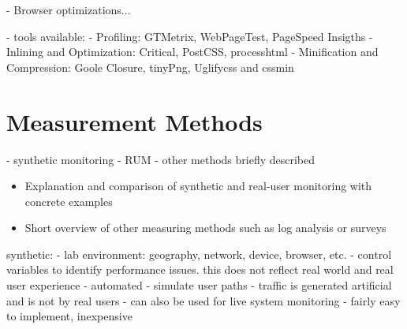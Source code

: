 





- Browser optimizations...

- tools available:
- Profiling: GTMetrix, WebPageTest, PageSpeed Insigths
- Inlining and Optimization: Critical, PostCSS, processhtml
- Minification and Compression: Goole Closure, tinyPng, Uglifycss and cssmin













\section{Measurement Methods}


- synthetic monitoring
- RUM
- other methods briefly described


\begin{itemize}
\item Explanation and comparison of synthetic and real-user monitoring with concrete examples
\item Short overview of other measuring methods such as log analysis or surveys
\end{itemize}








synthetic:
- lab environment: geography, network, device, browser, etc.
- control variables to identify performance issues. this does not reflect real world and real user experience
- automated
- simulate user paths
- traffic is generated artificial and is not by real users
 - can also be used for live system monitoring
 - fairly easy to implement, inexpensive

